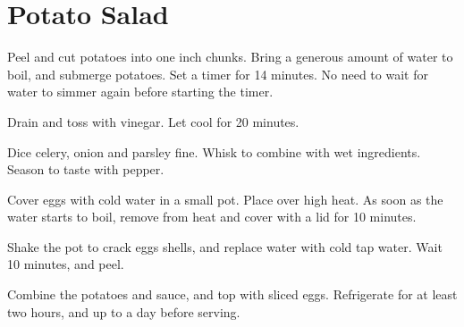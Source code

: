 \section{Potato Salad}
\begin{recipe}



Peel and cut potatoes into one inch chunks. Bring a generous amount of water to boil, and submerge potatoes. Set a timer for 14 minutes. No need to wait for water to simmer again before starting the timer.


Drain and toss with vinegar. Let cool for 20 minutes.


Dice celery, onion and parsley fine. Whisk to combine with wet ingredients. Season to taste with pepper.


Cover eggs with cold water in a small pot. Place over high heat. As soon as the water starts to boil, remove from heat and cover with a lid for 10 minutes.

Shake the pot to crack eggs shells, and replace water with cold tap water. Wait 10 minutes, and peel.

Combine the potatoes and sauce, and top with sliced eggs. Refrigerate for at least two hours, and up to a day before serving.

\end{recipe}
